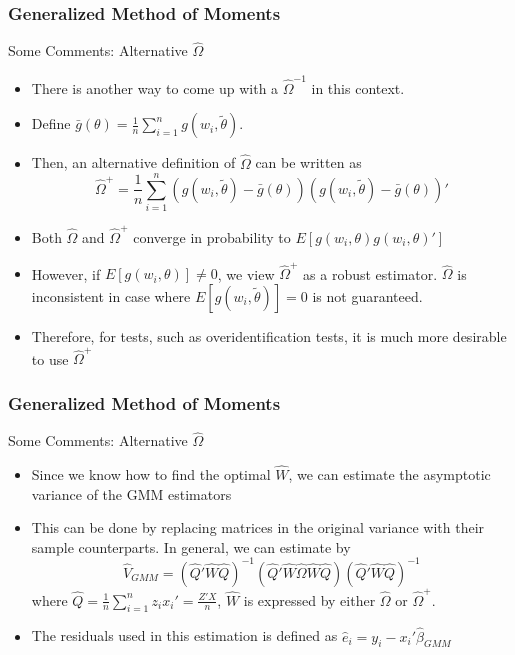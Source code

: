 \documentclass{beamer}
\begin{document}
\begin{frame}
\frametitle{Generalized Method of Moments}
Some Comments: Alternative $\widehat{\Omega}$
\begin{itemize}
\item There is another way to come up with a $\widehat{\Omega}^{-1}$ in this context. 
\item Define $\bar{g}(\theta)=\frac{1}{n}\sum_{i=1}^ng(w_i,\tilde{\theta})$. 
\item Then, an alternative definition of $\widehat{\Omega}$ can be written as
\[
\widehat{\Omega}^+=\frac{1}{n}\sum_{i=1}^n(g(w_i,\tilde{\theta})-\bar{g}(\theta))(g(w_i,\tilde{\theta})-\bar{g}(\theta))'
\]
\item Both $\widehat{\Omega}$ and $\widehat{\Omega}^+$ converge in probability to $E[g(w_i,\theta)g(w_i,\theta)']$
\item However, if $E[g(w_i, \theta)]\neq0$, we view $\widehat{\Omega}^+$ as a robust estimator. $\widehat{\Omega}$ is inconsistent in case where $E[g(w_i,\tilde{\theta})]=0$ is not guaranteed.
\item Therefore, for tests, such as overidentification tests, it is much more desirable to use $\widehat{\Omega}^+$
\end{itemize}
\end{frame}

\begin{frame}
\frametitle{Generalized Method of Moments}
Some Comments: Alternative $\widehat{\Omega}$
\begin{itemize}
\item Since we know how to find the optimal $\widehat{W}$, we can estimate the asymptotic variance of the GMM estimators
\item This can be done by replacing matrices in the original variance with their sample counterparts. In general, we can estimate by
\[
\widehat{V}_{GMM}=\left(\widehat{Q}'\widehat{W}\widehat{Q}\right)^{-1}\left(\widehat{Q}'\widehat{W}\widehat{\Omega}\widehat{W}\widehat{Q}\right)\left(\widehat{Q}'\widehat{W}\widehat{Q}\right)^{-1}
\]
where $\widehat{Q}=\frac{1}{n}\sum_{i=1}^n z_ix_i' = \frac{Z'X}{n}$, $\widehat{W}$ is expressed by either $\widehat{\Omega}$ or $\widehat{\Omega}^+$. 
\item The residuals used in this estimation is defined as $\hat{e}_i = y_i- x_i'\hat{\beta}_{GMM}$
\end{itemize}
\end{frame}
\end{document}
